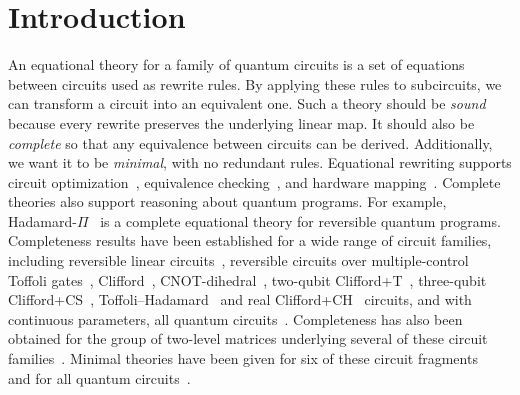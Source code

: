 \documentclass[acmsmall,nonacm,11pt,screen]{acmart}
\begin{document}
\maketitle

\section{Introduction}
An equational theory for a family of quantum circuits is a set of equations between circuits used as rewrite rules. By applying these rules to subcircuits, we can transform a circuit into an equivalent one. Such a theory should be \emph{sound} because every rewrite preserves the underlying linear map. It should also be \emph{complete} so that any equivalence between circuits can be derived. Additionally, we want it to be \emph{minimal}, with no redundant rules. Equational rewriting supports circuit optimization~\cite{hietala2021voqc,nam2018automated,maslov2008simplification,xu2022quartz}, equivalence checking~\cite{yamashita2010fast}, and hardware mapping~\cite{sivarajah2020tket}. Complete theories also support reasoning about quantum programs. For example,
\mbox{Hadamard-$\Pi$}~\cite{fang2026hadamard} is a complete
equational theory for reversible quantum programs. Completeness results have been established for a wide range of circuit families, including reversible linear circuits~\cite{lafont2003boolean,sakashita2013cnot}, reversible circuits over multiple-control Toffoli gates~\cite{feng2026complete,feng2026ancillas}, Clifford~\cite{selinger2015clifford,makary2021real,li2025qutrit,bian2026qupit}, CNOT-dihedral~\cite{amy2018cnotdihedral,blake2026phaseaffine}, two-qubit Clifford+T~\cite{bian2023cliffordt2}, three-qubit Clifford+CS~\cite{bian2023cliffordcs3}, Toffoli--Hadamard~\cite{amy2024toffoli} and real Clifford+CH~\cite{clement2026realcliffordch} circuits, and with continuous parameters, all quantum circuits~\cite{clement2023complete,clement2024extensions}. Completeness has also been obtained for the group of two-level matrices underlying several of these circuit families~\cite{greylyn2014,bian2021un,li2021on,fang2026hadamard,clement2019thesis}. Minimal theories have been given for six of these circuit fragments~\cite{blake2026simpler} and for all quantum circuits~\cite{clement2024minimal}.
\end{document}

